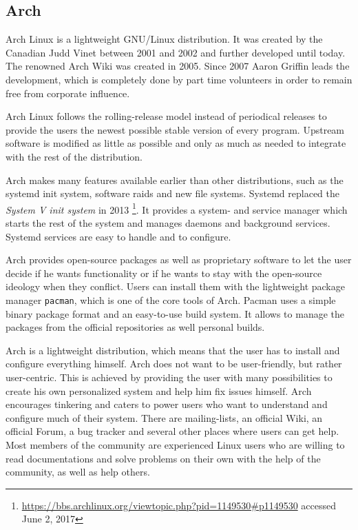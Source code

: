 \label{sec:related}
\subsection{Arch}
Arch Linux \cite{wiki:arch} is a lightweight GNU/Linux distribution.
It was created by the Canadian Judd Vinet between 2001 and 2002 and further developed until today.
The renowned Arch Wiki was created in 2005. Since 2007 Aaron Griffin leads the development, which is completely done by part time volunteers in order to remain free from corporate influence.

Arch Linux follows the rolling-release model instead of periodical releases to provide the users the newest possible stable version of every program.
Upstream software is modified as little as possible and only as much as needed to integrate with the rest of the distribution.

Arch makes many features available earlier than other distributions, such as the systemd init system, software raids and new file systems.
Systemd \cite{wiki:systemd} replaced the \emph{System V init system} in 2013 \footnote{\url{https://bbs.archlinux.org/viewtopic.php?pid=1149530\#p1149530} accessed June 2, 2017}.
It provides a system- and service manager which starts the rest of the system and manages daemons and background services.
Systemd services are easy to handle and to configure.

Arch provides open-source packages as well as proprietary software to let the user decide if he wants functionality or if he wants to stay with the open-source ideology when they conflict.
Users can install them with the lightweight package manager \texttt{pacman}, which is one of the core tools of Arch.
Pacman uses a simple binary package format and an easy-to-use build system. It allows to manage the packages from the official repositories as well personal builds.

Arch is a lightweight distribution, which means that the user has to install and configure everything himself.
Arch does not want to be user-friendly, but rather user-centric.
This is achieved by providing the user with many possibilities to create his own personalized system and help him fix issues himself.
Arch encourages tinkering and caters to power users who want to understand and configure much of their system.
There are mailing-lists, an official Wiki, an official Forum, a bug tracker and several other places where users can get help.
Most members of the community are experienced Linux users who are willing to read documentations and solve problems on their own with the help of the community, as well as help others.

